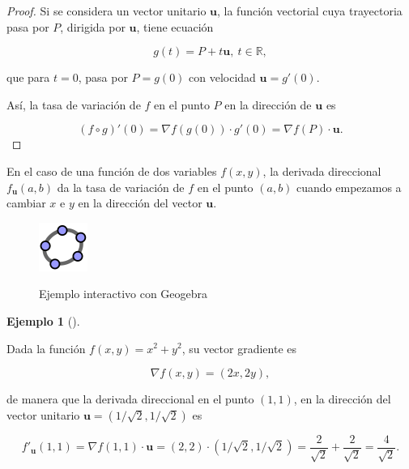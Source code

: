 \documentclass[
  a4paper,
]{scrreport}
\theoremstyle{definition}
\theoremstyle{plain}
\theoremstyle{plain}
\theoremstyle{definition}
\theoremstyle{definition}
\newtheorem{example}{Ejemplo}[chapter]
\theoremstyle{plain}
\theoremstyle{remark}
\begin{document}
\begin{tcolorbox}[enhanced jigsaw, breakable, title=\textcolor{quarto-callout-note-color}{\faInfo}\hspace{0.5em}{Demostración}, toprule=.15mm, coltitle=black, arc=.35mm, rightrule=.15mm, colframe=quarto-callout-note-color-frame, colbacktitle=quarto-callout-note-color!10!white, toptitle=1mm, titlerule=0mm, leftrule=.75mm, opacityback=0, colback=white, bottomrule=.15mm, bottomtitle=1mm, left=2mm, opacitybacktitle=0.6]

\begin{proof}

Si se considera un vector unitario \(\mathbf{u}\), la función vectorial
cuya trayectoria pasa por \(P\), dirigida por \(\mathbf{u}\), tiene
ecuación

\[
g(t)=P+t\mathbf{u},\ t\in\mathbb{R},
\]

que para \(t=0\), pasa por \(P=g(0)\) con velocidad
\(\mathbf{u}=g'(0)\).

Así, la tasa de variación de \(f\) en el punto \(P\) en la dirección de
\(\mathbf{u}\) es

\[
(f\circ g)'(0) = \nabla f(g(0))\cdot g'(0) = \nabla f(P)\cdot \mathbf{u}.
\]

\end{proof}

\end{tcolorbox}

En el caso de una función de dos variables \(f(x,y)\), la derivada
direccional \(f_{\mathbf{u}}(a,b)\) da la tasa de variación de \(f\) en
el punto \((a,b)\) cuando empezamos a cambiar \(x\) e \(y\) en la
dirección del vector \(\mathbf{u}\).

\begin{figure}

{\centering 

\href{https://www.geogebra.org/m/xyu2226b}{\includegraphics{img/logos/logo-geogebra.png}}

}

\caption{Ejemplo interactivo con Geogebra}

\end{figure}

\begin{example}[]\protect\hypertarget{exm-derivada-direccional}{}\label{exm-derivada-direccional}

Dada la función \(f(x,y) = x^2+y^2\), su vector gradiente es

\[
\nabla f(x,y) = (2x,2y),
\]

de manera que la derivada direccional en el punto \((1,1)\), en la
dirección del vector unitario \(\mathbf{u}=(1/\sqrt{2},1/\sqrt{2})\) es

\[
f'_{\mathbf{u}}(1,1) = \nabla f(1,1)\cdot \mathbf{u} = (2,2)\cdot(1/\sqrt{2},1/\sqrt{2}) = \frac{2}{\sqrt{2}}+\frac{2}{\sqrt{2}} = \frac{4}{\sqrt{2}}.
\]

\end{example}
\end{document}
